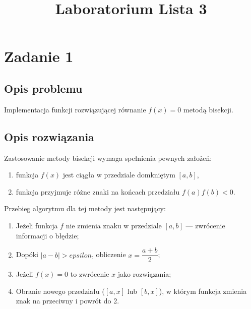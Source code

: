 \documentclass{classrep}
\author{
  \studentinfo{Agata Jasionowska}{229726}
}
\title{Laboratorium \ppauza Lista 3}
\begin{document}
\maketitle

\section{Zadanie 1}
	\subsection{Opis problemu}
		Implementacja funkcji rozwiązującej równanie $f(x)=0$ metodą bisekcji.
	
	\subsection{Opis rozwiązania}
		Zastosowanie metody bisekcji wymaga spełnienia pewnych założeń:
		\begin{enumerate}[1.]
			\item funkcja $f(x)$ jest ciągła w przedziale domkniętym $[a,b]$,
			\item funkcja przyjmuje różne znaki na końcach przedziału $f(a)f(b)<0$.
		\end{enumerate}
		
		Przebieg algorytmu dla tej metody jest następujący:
		\begin{enumerate}
			\item Jeżeli funkcja $f$ nie zmienia znaku w przedziale $[a,b]$ --- zwrócenie informacji o błędzie;
			\item Dopóki $|a-b|>epsilon$, obliczenie $x=\dfrac{a+b}{2}$;
			\item Jeżeli $f(x)=0$ to zwrócenie $x$ jako rozwiązania;
			\item Obranie nowego przedziału ($[a,x]$ lub $[b,x]$), w którym funkcja zmienia znak na przeciwny i powrót do 2.
		\end{enumerate}	
	
\end{document}
